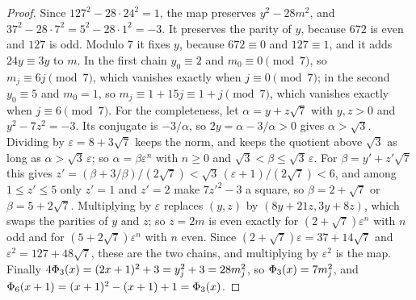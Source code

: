 \begin{proof}
Since $127^2 - 28 \cdot 24^2 = 1$, the map preserves $y^2 - 28m^2$, and $37^2 - 28 \cdot 7^2 = 5^2 - 28 \cdot 1^2 = -3$. It preserves the parity
of $y$, because $672$ is even and $127$ is odd. Modulo $7$ it fixes $y$, because $672 \equiv 0$ and $127 \equiv 1$, and it adds $24 y \equiv 3y$ to
$m$. In the first chain $y_0 \equiv 2$ and $m_0 \equiv 0 \pmod 7$, so $m_j \equiv 6j \pmod 7$, which vanishes exactly when $j \equiv 0 \pmod 7$; in
the second $y_0 \equiv 5$ and $m_0 = 1$, so $m_j \equiv 1 + 15j \equiv 1 + j \pmod 7$, which vanishes exactly when $j \equiv 6 \pmod 7$.
For the completeness, let $\alpha = y + z\sqrt 7$ with $y, z > 0$ and $y^2 - 7z^2 = -3$. Its conjugate is $-3/\alpha$, so $2y = \alpha - 3/\alpha > 0$
gives $\alpha > \sqrt 3$. Dividing by $\varepsilon = 8 + 3\sqrt 7$ keeps the norm, and keeps the quotient above $\sqrt 3$ as long as $\alpha > \sqrt 3\,\varepsilon$;
so $\alpha = \beta \varepsilon^n$ with $n \ge 0$ and $\sqrt 3 < \beta \le \sqrt 3\,\varepsilon$. For $\beta = y' + z'\sqrt 7$ this gives
$z' = (\beta + 3/\beta)/(2\sqrt 7) < \sqrt 3\,(\varepsilon + 1)/(2\sqrt 7) < 6$, and among $1 \le z' \le 5$ only $z' = 1$ and $z' = 2$ make $7z'^2 - 3$ a
square, so $\beta = 2 + \sqrt 7$ or $\beta = 5 + 2\sqrt 7$. Multiplying by $\varepsilon$ replaces $(y, z)$ by $(8y + 21z, 3y + 8z)$, which swaps the
parities of $y$ and $z$; so $z = 2m$ is even exactly for $(2 + \sqrt 7)\varepsilon^n$ with $n$ odd and for $(5 + 2\sqrt 7)\varepsilon^n$ with $n$ even. Since
$(2 + \sqrt 7)\varepsilon = 37 + 14\sqrt 7$ and $\varepsilon^2 = 127 + 48\sqrt 7$, these are the two chains, and multiplying by $\varepsilon^2$ is the map. Finally
$4\Phi_{3}(x) = (2x + 1)^2 + 3 = y_j^2 + 3 = 28 m_j^2$, so $\Phi_{3}(x) = 7 m_j^2$, and $\Phi_{6}(x + 1) = (x + 1)^2 - (x + 1) + 1 =
\Phi_{3}(x)$.
\end{proof}

